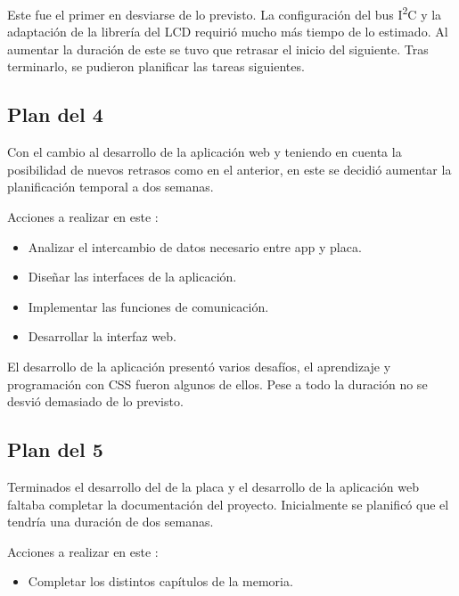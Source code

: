 
Este fue el primer  en desviarse de lo previsto. 
La configuración del bus I\textsuperscript{2}C y la adaptación de la librería
del LCD requirió mucho más tiempo de lo estimado. Al aumentar la duración
de este  se tuvo que retrasar el inicio del siguiente.
Tras terminarlo, se pudieron planificar las tareas siguientes.

\clearpage

\subsection{Plan del  4} \label{sec:plan-s4}
Con el cambio al desarrollo de la aplicación web y teniendo en cuenta la
posibilidad de nuevos retrasos como en el  anterior,
en este se decidió aumentar la planificación temporal a dos semanas.

Acciones a realizar en este :
\begin{itemize}
  \item Analizar el intercambio de datos necesario entre app y placa.
  \item Diseñar las interfaces de la aplicación. 
  \item Implementar las funciones de comunicación.
  \item Desarrollar la interfaz web.
\end{itemize}


El desarrollo de la aplicación presentó varios desafíos, el aprendizaje y 
programación con CSS fueron algunos de ellos. Pese a todo la duración no 
se desvió demasiado de lo previsto.

\clearpage

\subsection{Plan del  5} \label{sec:plan-s5}
Terminados el desarrollo del  de la placa y 
el desarrollo de la aplicación web faltaba completar la documentación del 
proyecto. Inicialmente se planificó que el 
tendría una duración de dos semanas.

Acciones a realizar en este :
\begin{itemize}
  \item Completar los distintos capítulos de la memoria.
\end{itemize}

